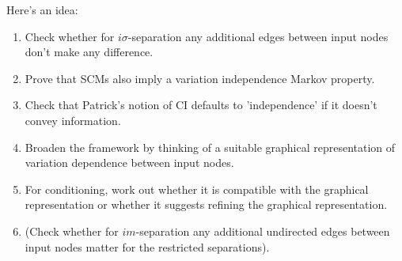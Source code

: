 Here's an idea:
\begin{enumerate}
  \item Check whether for $i\sigma$-separation any additional edges between input nodes don't make any difference.
  \item Prove that SCMs also imply a variation independence Markov property.
  \item Check that Patrick's notion of CI defaults to 'independence' if it doesn't convey information.
  \item Broaden the framework by thinking of a suitable graphical representation of variation dependence between input nodes.
  \item For conditioning, work out whether it is compatible with the graphical representation or whether it suggests refining the graphical representation.
  \item (Check whether for $im$-separation any additional undirected edges between input nodes matter for the restricted separations).
\end{enumerate}

